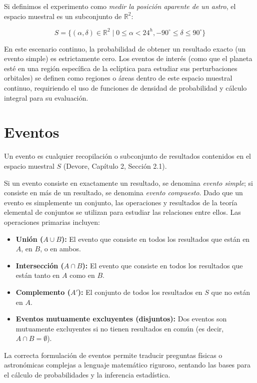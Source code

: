 Si definimos el experimento como \textit{medir la posición aparente de un astro}, el espacio muestral es un subconjunto de $\mathbb{R}^2$:

$$ S = \{ (\alpha, \delta) \in \mathbb{R}^2 \mid 0 \le \alpha < 24^h, -90^\circ \le \delta \le 90^\circ \} $$

En este escenario continuo, la probabilidad de obtener un resultado exacto (un evento simple) es estrictamente cero. Los eventos de interés (como que el planeta esté en una región específica de la eclíptica para estudiar sus perturbaciones orbitales) se definen como regiones o áreas dentro de este espacio muestral continuo, requiriendo el uso de funciones de densidad de probabilidad y cálculo integral para su evaluación.

\section{Eventos}

Un evento es cualquier recopilación o subconjunto de resultados contenidos en el espacio muestral $S$ (Devore, Capítulo 2, Sección 2.1). 

Si un evento consiste en exactamente un resultado, se denomina \textit{evento simple}; si consiste en más de un resultado, se denomina \textit{evento compuesto}. Dado que un evento es simplemente un conjunto, las operaciones y resultados de la teoría elemental de conjuntos se utilizan para estudiar las relaciones entre ellos. Las operaciones primarias incluyen:
\begin{itemize}
    \item \textbf{Unión ($A \cup B$):} El evento que consiste en todos los resultados que están en $A$, en $B$, o en ambos.
    \item \textbf{Intersección ($A \cap B$):} El evento que consiste en todos los resultados que están tanto en $A$ como en $B$.
    \item \textbf{Complemento ($A'$):} El conjunto de todos los resultados en $S$ que no están en $A$.
    \item \textbf{Eventos mutuamente excluyentes (disjuntos):} Dos eventos son mutuamente excluyentes si no tienen resultados en común (es decir, $A \cap B = \emptyset$).
\end{itemize}

La correcta formulación de eventos permite traducir preguntas físicas o astronómicas complejas a lenguaje matemático riguroso, sentando las bases para el cálculo de probabilidades y la inferencia estadística.

